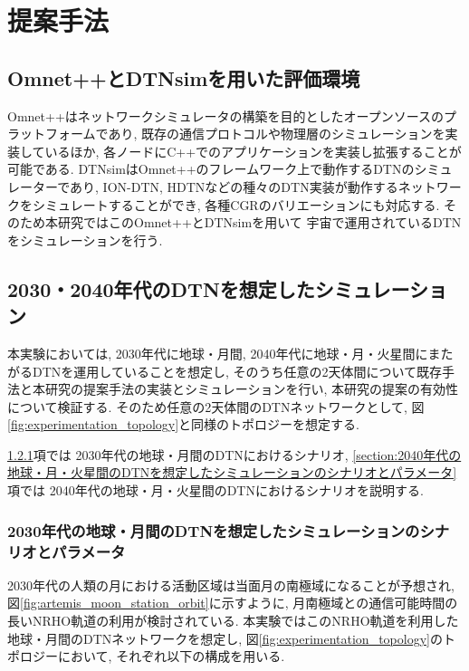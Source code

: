 \chapter{提案手法}
\label{chap:implementation_and_experimentation}

\section{Omnet++とDTNsimを用いた評価環境}
\label{section:Omnet++とDTNsimを用いた評価環境}
Omnet++はネットワークシミュレータの構築を目的としたオープンソースのプラットフォームであり, 
既存の通信プロトコルや物理層のシミュレーションを実装しているほか, 
各ノードにC++でのアプリケーションを実装し拡張することが可能である. 
DTNsimはOmnet++のフレームワーク上で動作するDTNのシミュレーターであり, 
ION-DTN, HDTNなどの種々のDTN実装が動作するネットワークをシミュレートすることができ, 
各種CGRのバリエーションにも対応する. そのため本研究ではこのOmnet++とDTNsimを用いて
宇宙で運用されているDTNをシミュレーションを行う. 

\section{2030・2040年代のDTNを想定したシミュレーション}
\label{section:2030・2040年代のDTNを想定したシミュレーション}
本実験においては, 2030年代に地球・月間, 2040年代に地球・月・火星間にまたがるDTNを運用していることを想定し, 
そのうち任意の2天体間について既存手法と本研究の提案手法の実装とシミュレーションを行い, 
本研究の提案の有効性について検証する. そのため任意の2天体間のDTNネットワークとして, 
図\ref{fig:experimentation_topology}と同様のトポロジーを想定する. 

\ref{section:2030年代の地球・月間のDTNを想定したシミュレーションのシナリオとパラメータ}項では
2030年代の地球・月間のDTNにおけるシナリオ, 
\ref{section:2040年代の地球・月・火星間のDTNを想定したシミュレーションのシナリオとパラメータ}項では
2040年代の地球・月・火星間のDTNにおけるシナリオを説明する. 

\subsection{2030年代の地球・月間のDTNを想定したシミュレーションのシナリオとパラメータ}
\label{section:2030年代の地球・月間のDTNを想定したシミュレーションのシナリオとパラメータ}
2030年代の人類の月における活動区域は当面月の南極域になることが予想され, 
図\ref{fig:artemis_moon_station_orbit}に示すように, 
月南極域との通信可能時間の長いNRHO軌道の利用が検討されている. 
本実験ではこのNRHO軌道を利用した地球・月間のDTNネットワークを想定し, 
図\ref{fig:experimentation_topology}のトポロジーにおいて, 
それぞれ以下の構成を用いる. 

